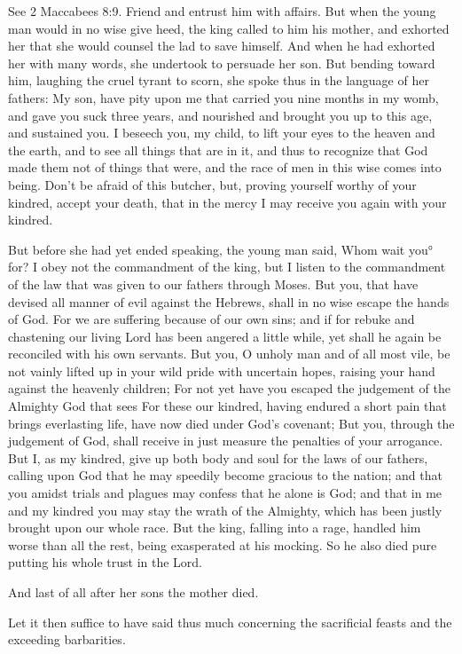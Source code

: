 {{See 2 Maccabees 8:9.
} Friend and entrust him with affairs.
But when the young man would in no wise give heed, the king called to him his mother, and exhorted her that she would counsel the lad to save himself.
And when he had exhorted her with many words, she undertook to persuade her son.
But bending toward him, laughing the cruel tyrant to scorn, she spoke thus in the language of her fathers: My son, have pity upon me that carried you nine months in my womb, and gave you suck three years, and nourished and brought you up to this age, and sustained you.
I beseech you, my child, to lift your eyes to the heaven and the earth, and to see all things that are in it, and thus to recognize that God made them not of things that were, and
{} the race of men in this wise comes into being.
Don’t be afraid of this butcher, but, proving yourself worthy of your kindred, accept your death, that in the mercy
{} I may receive you again with your kindred.
\par }{\PP {}But before she had yet ended speaking, the young man said, Whom wait you° for? I obey not the commandment of the king, but I listen to the commandment of the law that was given to our fathers through Moses.
But you, that have devised all manner of evil against the Hebrews, shall in no wise escape the hands of God.
For we are suffering because of our own sins;
and if for rebuke and chastening our living Lord has been angered a little while, yet shall he again be reconciled with his own servants.
But you, O unholy man and of all most vile, be not vainly lifted up in your wild pride with uncertain hopes, raising your hand against the heavenly children;
For not yet have you escaped the judgement of the Almighty God that sees
{}
For these our kindred, having endured a
 short pain that brings everlasting life, have now
 died under God’s covenant; But you, through the judgement of God, shall receive in just measure the penalties of your arrogance.
But I, as my kindred, give up both body and soul for the laws of our fathers, calling upon God that he may speedily become
 gracious to the nation; and that you amidst trials and plagues may confess that he alone is God;
and that in me and my kindred
 you may stay the wrath of the Almighty, which has been justly brought upon our whole race.
But the king, falling into a rage, handled him worse than all the rest, being exasperated at his mocking.
So he also died pure
{} putting his whole trust in the Lord.
\par }{\PP {}And last of all after her sons the mother died.
\par }{\PP {}Let it then suffice to have said thus much concerning the
{} sacrificial feasts and the
{} exceeding barbarities.

}
